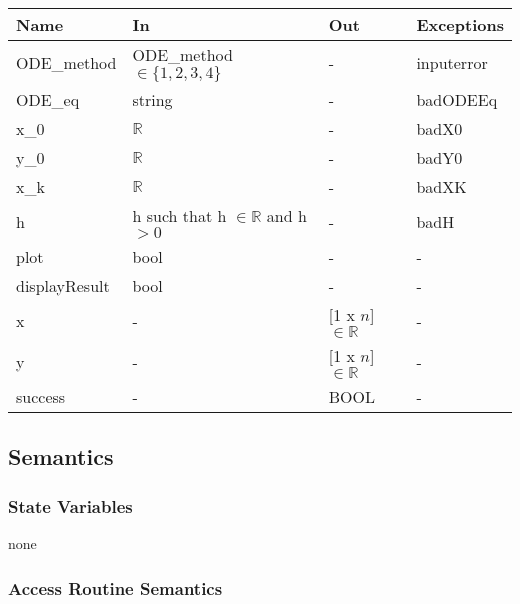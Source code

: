 \documentclass[12pt, titlepage]{article}
\begin{document}
\begin{center}
\begin{tabular}{p{4cm} p{4cm} p{4cm} p{2cm}}
\hline
\textbf{Name} & \textbf{In} & \textbf{Out} & \textbf{Exceptions} \\
\hline
ODE\_method & ODE\_method $\in \{1, 2, 3, 4\}$  & - &  inputerror\\
ODE\_eq & string & - & badODEEq\\
x\_0 & $\mathbb{R}$ & - & badX0\\
y\_0 & $\mathbb{R}$ & - & badY0\\
x\_k & $\mathbb{R}$ & - & badXK\\
h & h such that h $\in \mathbb{R}$ and h $> 0$ & - & badH\\
plot & bool & - & - \\
displayResult & bool & - & - \\
x & - & [1 x $n$] $\in \mathbb{R}$ & - \\
y & - & [1 x $n$] $\in \mathbb{R}$ & - \\
success & - & BOOL & - \\
\hline
\end{tabular}
\end{center}

\subsection{Semantics}

\subsubsection{State Variables}
none

\newpage

\subsubsection{Access Routine Semantics}
\end{document}
